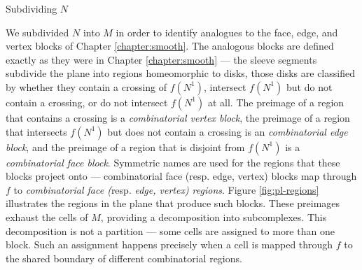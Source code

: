 \begin{algorithm}[h!]
	\caption{Subdividing $N$}
	\label{alg:subdividing-manifold}
\end{algorithm}


We subdivided $N$ into $M$ in order to identify analogues to the face, edge, and vertex blocks of Chapter \ref{chapter:smooth}.
The analogous blocks are defined exactly as they were in Chapter \ref{chapter:smooth} --- the sleeve segments subdivide the plane into regions homeomorphic to disks, those disks are classified by whether they contain a crossing of $f(N^1)$, intersect $f(N^1)$ but do not contain a crossing, or do not intersect $f(N^1)$ at all.
The preimage of a region that contains a crossing is a \emph{combinatorial vertex block}, the preimage of a region that intersects $f(N^1)$ but does not contain a crossing is an \emph{combinatorial edge block}, and the preimage of a region that is disjoint from $f(N^1)$ is a \emph{combinatorial face block}.
Symmetric names are used for the regions that these blocks project onto --- combinatorial face (resp. edge, vertex) blocks map through $f$ to \emph{combinatorial face (}resp. \emph{edge, vertex) regions}.
Figure \ref{fig:pl-regions} illustrates the regions in the plane that produce such blocks.
These preimages exhaust the cells of $M$, providing a decomposition into subcomplexes.
This decomposition is not a partition --- some cells are assigned to more than one block.
Such an assignment happens precisely when a cell is mapped through $f$ to the shared boundary of different combinatorial regions.

